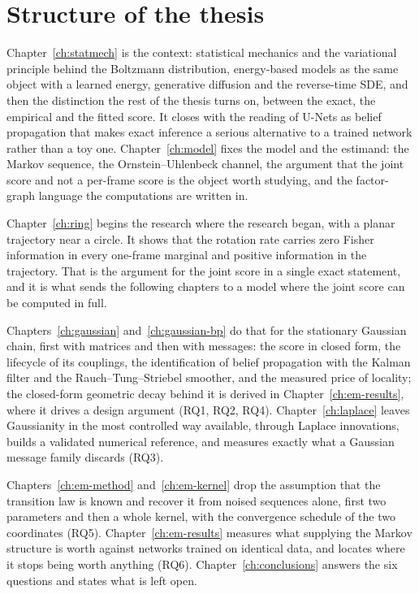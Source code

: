 \section{Structure of the thesis}

Chapter~\ref{ch:statmech} is the context: statistical mechanics and the
variational principle behind the Boltzmann distribution, energy-based models as
the same object with a learned energy, generative diffusion and the reverse-time
SDE, and then the distinction the rest of the thesis turns on, between the
exact, the empirical and the fitted score. It closes with the reading of U-Nets
as belief propagation that makes exact inference a serious alternative to a
trained network rather than a toy one. Chapter~\ref{ch:model} fixes the model
and the estimand: the Markov sequence, the Ornstein--Uhlenbeck channel, the
argument that the joint score and not a per-frame score is the object worth
studying, and the factor-graph language the computations are written in.

Chapter~\ref{ch:ring} begins the research where the research began, with a
planar trajectory near a circle. It shows that the rotation rate carries zero
Fisher information in every one-frame marginal and positive information in the
trajectory. That is the argument for the joint score in a single exact
statement, and it is what sends the following chapters to a model where the
joint score can be computed in full.

Chapters~\ref{ch:gaussian} and~\ref{ch:gaussian-bp} do that for the stationary
Gaussian chain, first with matrices and then with messages: the score in closed
form, the lifecycle of its couplings, the identification of belief propagation
with the Kalman filter and the Rauch--Tung--Striebel smoother, and the
measured price of locality; the closed-form geometric decay behind it is
derived in Chapter~\ref{ch:em-results}, where it drives a design argument
(RQ1, RQ2, RQ4). Chapter~\ref{ch:laplace} leaves Gaussianity in the most
controlled way available, through Laplace innovations, builds a validated
numerical reference, and measures exactly what a Gaussian message family
discards (RQ3).

Chapters~\ref{ch:em-method} and~\ref{ch:em-kernel} drop the assumption that the
transition law is known and recover it from noised sequences alone, first two
parameters and then a whole kernel, with the convergence schedule of the two
coordinates (RQ5). Chapter~\ref{ch:em-results}
measures what supplying the Markov structure is worth against networks trained
on identical data, and locates where it stops being worth anything (RQ6).
Chapter~\ref{ch:conclusions} answers the six questions and states what is left
open.